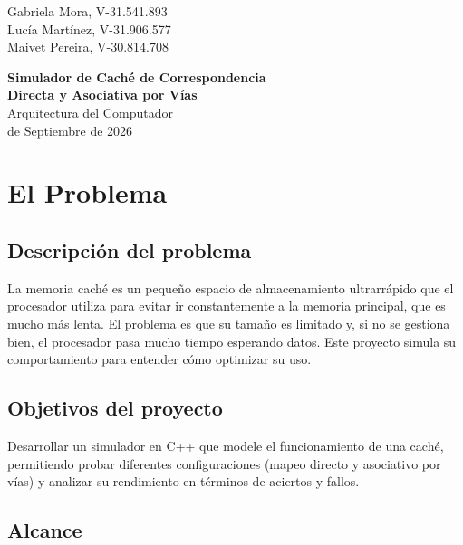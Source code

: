 \documentclass[14pt]{article}
\renewcommand{\large}{\fontsize{16}{20}\selectfont}
\renewcommand{\LARGE}{\fontsize{24}{28}\selectfont}
\begin{document}
\begin{flushright}
\large
Gabriela Mora, V-31.541.893 \\
Lucía Martínez, V-31.906.577 \\
Maivet Pereira, V-30.814.708 \\
\end{flushright}

\vspace{1.5cm}

\begin{center}
    {\LARGE \textbf{Simulador de Caché de Correspondencia} \\[0.3cm]
    \textbf{Directa y Asociativa por Vías}} \\[0.8cm]
    \large Arquitectura del Computador \\[0.5cm]
    \large 1 de Septiembre de 2026
\end{center}

\vspace{1.5cm}

\section*{El Problema}

\subsection*{Descripción del problema}

La memoria caché es un pequeño espacio de almacenamiento ultrarrápido que el procesador utiliza para evitar ir constantemente a la memoria principal, que es mucho más lenta. El problema es que su tamaño es limitado y, si no se gestiona bien, el procesador pasa mucho tiempo esperando datos. Este proyecto simula su comportamiento para entender cómo optimizar su uso.

\subsection*{Objetivos del proyecto}

Desarrollar un simulador en C++ que modele el funcionamiento de una caché, permitiendo probar diferentes configuraciones (mapeo directo y asociativo por vías) y analizar su rendimiento en términos de aciertos y fallos.

\subsection*{Alcance}
\end{document}
